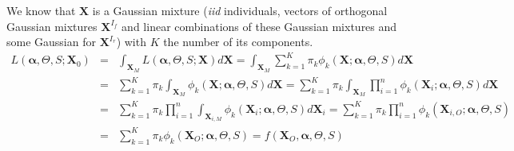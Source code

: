 \documentclass[12pt,a4paper]{report}
\begin{document}
%		

We know that $\boldsymbol{X}$ is a Gaussian mixture ({\it iid} individuals, vectors of orthogonal Gaussian mixtures $\boldsymbol{X}^{I_f}$ and linear combinations of these Gaussian mixtures and some Gaussian for $\boldsymbol{X}^{I_r}$) with $K$ the number of its components.
\begin{eqnarray}
	L(\boldsymbol{\alpha},\Theta,S;\boldsymbol{X}_0)&=&\int_{\boldsymbol{X}_M}L(\boldsymbol{\alpha},\Theta,S;\boldsymbol{X})d\boldsymbol{X} 
	=\int_{\boldsymbol{X}_M}\sum_{k=1}^K \pi_k \phi_k(\boldsymbol{X};\boldsymbol{\alpha},\Theta,S)d\boldsymbol{X} \\
	&=&\sum_{k=1}^K \pi_k \int_{\boldsymbol{X}_M}\phi_k(\boldsymbol{X};\boldsymbol{\alpha},\Theta,S)d\boldsymbol{X} 
	=\sum_{k=1}^K \pi_k \int_{\boldsymbol{X}_M}\prod_{i=1}^n\phi_k(\boldsymbol{X}_i;\boldsymbol{\alpha},\Theta,S)d\boldsymbol{X} \\
	&=&\sum_{k=1}^K \pi_k \prod_{i=1}^n\int_{\boldsymbol{X}_{i,M}}\phi_k(\boldsymbol{X}_i;\boldsymbol{\alpha},\Theta,S)d\boldsymbol{X}_i 
	=\sum_{k=1}^K \pi_k \prod_{i=1}^n\phi_k(\boldsymbol{X}_{i,O};\boldsymbol{\alpha},\Theta,S)\\
	&=&\sum_{k=1}^K \pi_k \phi_k(\boldsymbol{X}_{O};\boldsymbol{\alpha},\Theta,S)=f(\boldsymbol{X}_{O},\boldsymbol{\alpha},\Theta,S)
\end{eqnarray}
\end{document}
